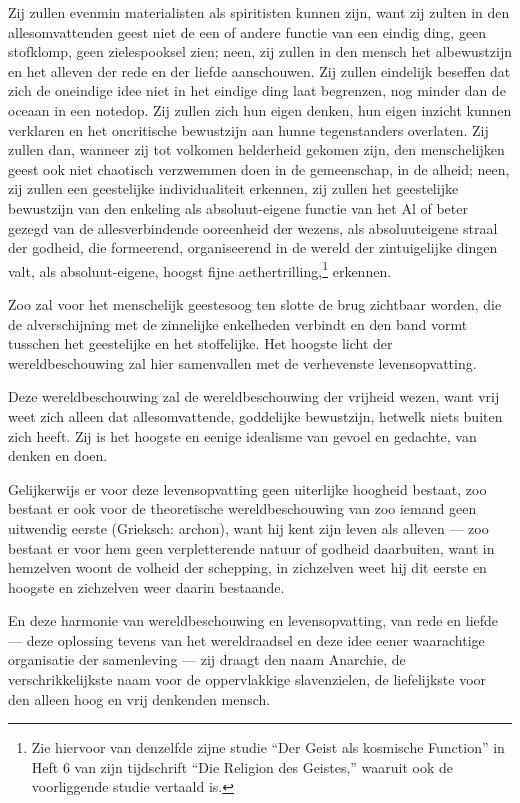 \documentclass[a4paper, 12pt, oneside, dutch]{article}
\begin{document}
Zij zullen evenmin materialisten als spiritisten kunnen zijn, want zij zulten in den allesomvattenden geest niet de een of andere functie van een eindig ding, geen stofklomp, geen zielespooksel zien; neen, zij zullen in den mensch het albewustzijn en het alleven der rede en der liefde aanschouwen. Zij zullen eindelijk beseffen dat zich de oneindige idee niet in het eindige ding laat begrenzen, nog minder dan de oceaan in een notedop. Zij zullen zich hun eigen denken, hun eigen inzicht kunnen verklaren en het oncritische bewustzijn aan hunne tegenstanders overlaten. Zij zullen dan, wanneer zij tot volkomen helderheid gekomen zijn, den menschelijken geest ook niet chaotisch verzwemmen doen in de gemeenschap, in de alheid; neen, zij zullen een geestelijke individualiteit erkennen, zij zullen het geestelijke bewustzijn van den enkeling als absoluut-eigene functie van het Al of beter gezegd van de allesverbindende ooreenheid der wezens, als absoluuteigene straal der godheid, die formeerend, organiseerend in de wereld der zintuigelijke dingen valt, als absoluut-eigene, hoogst fijne aethertrilling,\footnote{Zie hiervoor van denzelfde zijne studie "`Der Geist als kosmische Function"' in Heft 6 van zijn tijdschrift "`Die Religion des Geistes,"' waaruit ook de voorliggende studie vertaald is.} erkennen.

Zoo zal voor het menschelijk geestesoog ten slotte de brug zichtbaar worden, die de alverschijning met de zinnelijke enkelheden verbindt en den band vormt tusschen het geestelijke en het stoffelijke. Het hoogste licht der wereldbeschouwing zal hier samenvallen met de verhevenste levensopvatting.

Deze wereldbeschouwing zal de wereldbeschouwing der vrijheid wezen, want vrij weet zich alleen dat allesomvattende, goddelijke bewustzijn, hetwelk niets buiten zich heeft. Zij is het hoogste en eenige idealisme van gevoel en gedachte, van denken en doen.

Gelijkerwijs er voor deze levensopvatting geen uiterlijke hoogheid bestaat, zoo bestaat er ook voor de theoretische wereldbeschouwing van zoo iemand geen uitwendig eerste (Grieksch: archon), want hij kent zijn leven als alleven --- zoo bestaat er voor hem geen verpletterende natuur of godheid daarbuiten, want in hemzelven woont de volheid der schepping, in zichzelven weet hij dit eerste en hoogste en zichzelven weer daarin bestaande.

En deze harmonie van wereldbeschouwing en levensopvatting, van rede en liefde --- deze oplossing tevens van het wereldraadsel en deze idee eener waarachtige organisatie der samenleving --- zij draagt den naam Anarchie, de verschrikkelijkste naam voor de oppervlakkige slavenzielen, de liefelijkste voor den alleen hoog en vrij denkenden mensch.
\end{document}
